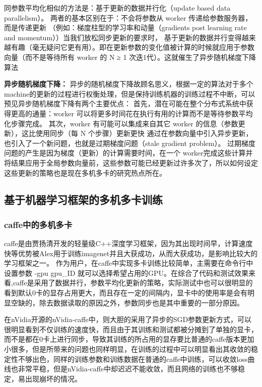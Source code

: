 同参数平均化相似的方法是：基于更新的数据并行化（update based data parallelism）。
两者的基本区别在于：不会将参数从 worker 传递给参数服务器，而是传递更新
（例如：梯度柱型的学习率和动量（gradients post learning rate and momentum））当我们放松同步更新的要求时，
基于更新的数据并行变得越来越有趣（毫无疑问它更有用）。即在更新参数的变化值被计算的时候就应用于参数向量（而不是等待所有 worker 的 N ≥ 1 次迭1代）。这就催生了异步随机梯度下降算法

\textbf{异步随机梯度下降：}
异步的随机梯度下降故顾名思义，根据一定的算法对于多个machine的更新的过程进行权衡处理，但是保持训练机器的训练过程不中断，可以预见异步随机梯度下降有两个主要优点：
首先，潜在可能在整个分布式系统中获得更高的通量：worker 可以将更多时间花在执行有用的计算而不是等待参数平均化步骤完成。
其次，worker 有可能可以集成来自其它 worker 的信息（参数更新），这比使用同步（每 N 个步骤）更新更快
通过在参数向量中引入异步更新，也引入了一个新问题，也就是过期梯度问题（stale gradient problem）。
过期梯度问题的产生是因为梯度（更新）的计算需要时间，在一个 worker完成这些计算并将结果应用于全局参数向量前，这些参数可能已经更新过许多次了，所以如何设定这些更新的策略也是现在多机多卡的研究热点所在。

\subsection{基于机器学习框架的多机多卡训练}
\subsubsection{caffe中的多机多卡}
caffe\cite{CAFFE}是由贾扬清开发的轻量级C++深度学习框架，因为其出现时间早，计算速度快等优势被Alex用于训练imagenet并且大获成功，从而大获成功，是影响比较大的学习框架之一。
作为用户，在caffe中实现多卡训练比较简单，主需要在命令行中设置参数 -gpu  gpu\_ID 就可以选择希望占用的GPU。在综合了代码和测试效果来看,caffe是采用了数据并行，参数平均化更新的策略，实际测试中也可以很明显的看到默认0卡的显存占用更大，而且存在一定的间隔内，显卡中的使用率是会有明显空缺的，除去数据读取的原因之外，参数同步也是其中重要的一部分原因。

在nVidia开源的nVidia-caffe中，则大胆的采用了异步的SGD参数更新方式，可以很明显看到不仅训练的速度快，而且由于其训练和测试都被分摊到了单独的显卡，而不是都在0卡上进行同步，导致其训练的所占用的显存要比普通的caffe版本更加小很多，但是所带来的问题也同样明显，在训练的过程中可以明显看出其收敛的稳定性不够出色，同样的训练参数和训练数据在普通的caffe中训练，可以收敛loss曲线也非常平稳，但是nVidia-caffe中却迟迟不能收敛，而且网络的训练也不够稳定，易出现崩坏的情况。

